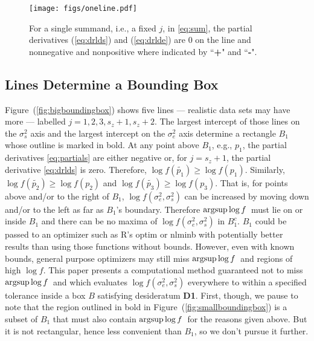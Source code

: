 \documentclass{report}
\newcommand{\textcompute}{\textsf}
\newcommand{\R}{\textcompute{R}\xspace}
\newcommand{\RL}{f}
\newcommand{\logRL}{\log\RL}
\newcommand{\sigssq}{\sigma_s^2}
\newcommand{\sigesq}{\sigma_e^2}
\newcommand{\logRLss}{\logRL(\sigesq,\sigssq)}
\newcommand{\mrle}{$\argsup\log f$}
\newcommand{\argsup}{\operatornamewithlimits{argsup}}
\begin{document}
\begin{figure}[h]
	\centering
	\texttt{[image: figs/oneline.pdf]}
	\caption{For a single summand, i.e., a fixed $j$, in \eqref{eq:sum},
	              the partial derivatives (\ref{eq:drlds}) and (\ref{eq:drlde})
	              are 0 on the line and nonnegative and nonpositive
	              where indicated by ``\textbf{+}" and ``\textbf{-}".}
	\label{fig:oneline}
\end{figure}

\subsection{Lines Determine a Bounding Box}
\label{sec:boundingbox}

Figure~(\ref{fig:bigboundingbox}) shows five lines --- realistic data sets may have more --- labelled $j=1, 2, 3, s_z+1, s_z+2$.  The largest intercept of those lines on the $\sigssq$ axis and the largest intercept on the $\sigesq$ axis determine a rectangle $B_1$ whose outline is marked in bold.  At any point above $B_1$, e.g., $p_1$, the partial derivatives \eqref{eq:partials} are either negative or, for $j=s_z+1$, the partial derivative \eqref{eq:drlds} is zero.  Therefore, $\logRL(\widetilde{p_1}) \ge \logRL(p_1)$.  Similarly, $\logRL(\widetilde{p_2}) \ge \logRL(p_2)$ and $\logRL(\widetilde{p_3}) \ge \logRL(p_3)$.  That is, for points above and/or to the right of $B_1$, $\logRLss$ can be increased by moving down and/or to the left as far as $B_1$'s boundary.  Therefore \mrle\ must lie on or inside $B_1$ and there can be no maxima of $\logRLss$ in $B_1^c$.  $B_1$ could be passed to an optimizer such as \R's \textsf{optim} or \textsf{nlminb} with potentially better results than using those functions without bounds.  However, even with known bounds, general purpose optimizers may still miss \mrle\ and regions of high $\logRL$.  This paper presents a computational method guaranteed not to miss \mrle\ and which evaluates $\logRLss$ everywhere to within a specified tolerance inside a box $B$ satisfying desideratum \textbf{D1}.  First, though, we pause to note that the region outlined in bold in Figure~(\ref{fig:smallboundingbox}) is a subset of $B_1$ that must also contain \mrle\ for the reasons given above.  But it is not rectangular, hence less convenient than $B_1$, so we don't pursue it further.
\end{document}

